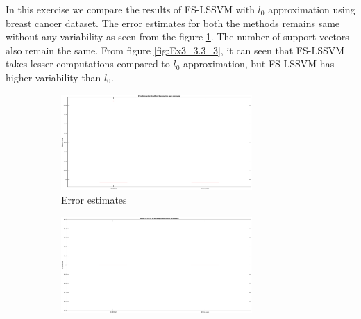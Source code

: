 In this exercise we compare the results of FS-LSSVM with $l_0$ approximation using breast cancer dataset. The error estimates for both the methods remains same without any variability as seen from the figure \ref{fig:Ex3_3.3_1}. The number of support vectors also remain the same. From figure \ref{fig:Ex3_3.3_3}, it can seen that FS-LSSVM takes lesser computations compared to $l_0$ approximation, but FS-LSSVM has higher variability than $l_0$.
\begin{figure}[!htpb]
	\begin{subfigure}[b]{0.34\textwidth}
		\centering
		\includegraphics[height= 0.65\textwidth, width = 0.8\textwidth]{Exercise3/Report/Ex3_3.3_1.eps}
		\caption{Error estimates }\label{fig:Ex3_3.3_1}
	\end{subfigure}%
	\begin{subfigure}[b]{0.34\textwidth}
		\centering
		\includegraphics[height= 0.65\textwidth, width = 0.8\textwidth]{Exercise3/Report/Ex3_3.3_2.eps}

\end{subfigure}
\end{figure}

